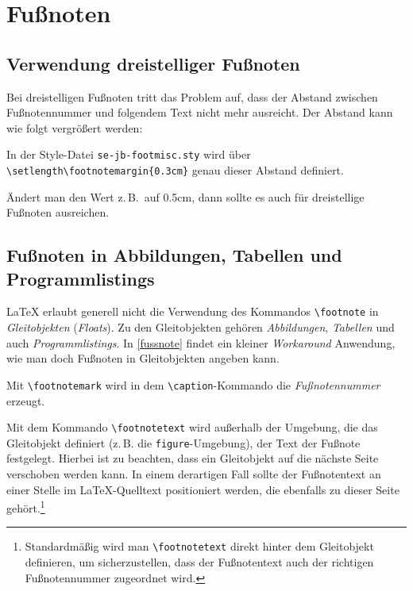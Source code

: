 \section{Fu{\ss}noten}

\subsection{Verwendung dreistelliger Fu{\ss}noten}

Bei dreistelligen Fu{\ss}noten tritt das Problem auf, dass der Abstand zwischen Fu{\ss}notennummer und folgendem Text nicht mehr ausreicht.
Der Abstand kann wie folgt vergr\"o{\ss}ert werden:

\begin{seList}
\item
In der Style-Datei \texttt{se-jb-footmisc.sty} wird \"uber \newline \texttt{\textbackslash{}setlength\textbackslash{}footnotemargin\{0.3cm\}} genau dieser Abstand definiert.
\item
\"Andert man den Wert z.\,B.\ auf 0.5cm, dann sollte es auch f\"ur dreistellige Fu{\ss}noten ausreichen.
\end{seList}

\subsection{Fu{\ss}noten in Abbildungen, Tabellen und Programmlistings}

\LaTeX{} erlaubt generell nicht die Verwendung des Kommandos \verb+\footnote+ in \textsl{Gleitobjekten} (\textsl{Floats}). 
Zu den Gleitobjekten geh\"oren \textsl{Abbildungen}, \textsl{Tabellen} und auch \textsl{Programmlistings}. In \vref{fussnote} findet ein 
kleiner \textsl{Workaround} Anwendung, wie man doch Fu{\ss}noten in Gleitobjekten angeben kann. 

\begin{seList}
\item Mit \verb+\footnotemark+ wird in dem \verb+\caption+-Kommando die \textsl{Fu{\ss}notennummer} erzeugt.
\item Mit dem Kommando \verb+\footnotetext+ wird au{\ss}erhalb der Umgebung, die das Gleitobjekt definiert (z.\,B. die 
\verb+figure+-Umgebung), der Text der Fu{\ss}note festgelegt. Hierbei ist zu beachten, dass ein Gleitobjekt auf die n\"achste Seite 
verschoben werden kann. In einem derartigen Fall sollte der Fu{\ss}notentext an einer Stelle im \LaTeX-Quelltext positioniert werden, die ebenfalls zu dieser Seite geh\"ort.\footnote{Standardm\"a{\ss}ig wird man \texttt{\textbackslash{}footnotetext} direkt hinter dem Gleitobjekt definieren, um sicherzustellen,
dass der Fu{\ss}notentext auch der richtigen Fu{\ss}notennummer zugeordnet wird.}
\end{seList}
